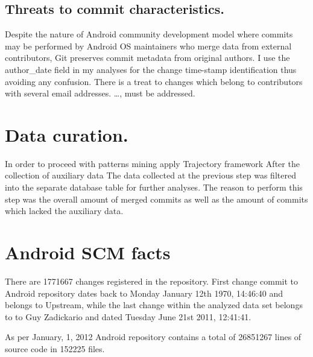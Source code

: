 \documentclass[a4paper,10pt]{article}
\numberwithin{equation}{subsection}
\begin{document}
\subsection{Threats to commit characteristics.}
Despite the nature of Android community development model where commits may be performed by 
Android OS maintainers who merge data from external contributors, Git preserves commit metadata 
from original authors. I use the author\_date field in my analyses for the change time-stamp identification 
thus avoiding any confusion.
There is a treat to changes which belong to contributors with several email addresses. \ldots, must be addressed.

\section{Data curation.}
In order to proceed with patterns mining apply Trajectory framework After the collection of auxiliary data The data collected at the previous step was filtered into the separate database table for further analyses.
The reason to perform this step was the overall amount of merged commits as well as the amount of commits
which lacked the auxiliary data.

\section{Android SCM facts}
There are 1771667 changes registered in the repository. First change commit to Android repository dates back 
to Monday January 12th 1970, 14:46:40 and belongs to Upstream, while the last change
within the analyzed data set belongs to to Guy Zadickario and dated 
Tuesday June 21st 2011, 12:41:41.

As per January, 1, 2012 Android repository contains a total of 26851267 lines of source code in 
152225 files. 
\end{document}
